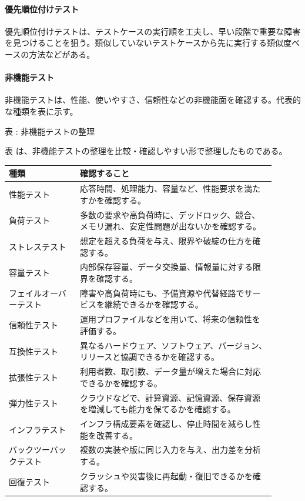 \paragraph{優先順位付けテスト}
優先順位付けテストは、テストケースの実行順を工夫し、早い段階で重要な障害を見つけることを狙う。類似していないテストケースから先に実行する類似度ベースの方法などがある。

\paragraph{非機能テスト}
非機能テストは、性能、使いやすさ、信頼性などの非機能面を確認する。代表的な種類を表に示す。

\par\smallskip\noindent{}\label{tab:ch05-02}表 \thetable: 非機能テストの整理\par\smallskip
表 \thetable は、非機能テストの整理を比較・確認しやすい形で整理したものである。\par\smallskip
\begin{longtable}{P{0.24\linewidth}P{0.66\linewidth}}
\toprule
種類 & 確認すること \\
\midrule
性能テスト & 応答時間、処理能力、容量など、性能要求を満たすかを確認する。\\
負荷テスト & 多数の要求や高負荷時に、デッドロック、競合、メモリ漏れ、安定性問題が出ないかを確認する。\\
ストレステスト & 想定を超える負荷を与え、限界や破綻の仕方を確認する。\\
容量テスト & 内部保存容量、データ交換量、情報量に対する限界を確認する。\\
フェイルオーバーテスト & 障害や高負荷時にも、予備資源や代替経路でサービスを継続できるかを確認する。\\
信頼性テスト & 運用プロファイルなどを用いて、将来の信頼性を評価する。\\
互換性テスト & 異なるハードウェア、ソフトウェア、バージョン、リリースと協調できるかを確認する。\\
拡張性テスト & 利用者数、取引数、データ量が増えた場合に対応できるかを確認する。\\
弾力性テスト & クラウドなどで、計算資源、記憶資源、保存資源を増減しても能力を保てるかを確認する。\\
インフラテスト & インフラ構成要素を確認し、停止時間を減らし性能を改善する。\\
バックツーバックテスト & 複数の実装や版に同じ入力を与え、出力差を分析する。\\
回復テスト & クラッシュや災害後に再起動・復旧できるかを確認する。\\
\bottomrule
\end{longtable}

